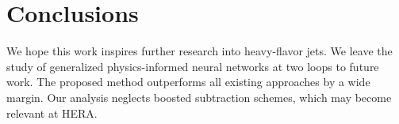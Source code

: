 \section{Conclusions}\label{sec:conclusions}

We hope this work inspires further research into heavy-flavor jets. We
leave the study of generalized physics-informed neural networks at two
loops to future work. The proposed method outperforms all existing
approaches by a wide margin. Our analysis neglects boosted subtraction
schemes, which may become relevant at HERA.

